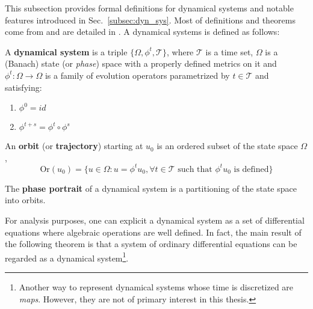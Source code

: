 This subsection provides formal definitions for dynamical systems and notable features introduced in Sec.~\ref{subsec:dyn_sys}. Most of definitions and theorems come from and are detailed in \cite{strogatz2018nonlinear, kuznetsov2013elements,Golubitsky2003a,Berglund2006,thompson2011predicting,dobrushkin2014applied}. A dynamical systems is defined as follows:
\begin{definition}
	A \textbf{dynamical system} is a triple $\{\Omega, \phi^t, \mathcal{T}\}$, where $\mathcal{T}$ is a time set, $\Omega$ is a (Banach) state (or \textit{phase}) space with a properly defined metrics on it and $\phi^t: \Omega \to \Omega$ is a family of evolution operators parametrized by $t \in \mathcal{T}$ and satisfying:
	\renewcommand{\theenumi}{\roman{enumi}}%
	\begin{enumerate}
		\item $\phi^0 = id$
		\item $\phi^{t+s} = \phi^t \circ \phi^s$ 
	\end{enumerate}
\end{definition}
\begin{definition}
	An \textbf{orbit} (or \textbf{trajectory}) starting at $u_0$ is an ordered subset of the state space $\Omega$,
	\begin{equation*}
		\text{Or}(u_0) = \{ u \in \Omega : u = \phi^t u_0, \forall t \in \mathcal{T} \text{ such that } \phi^t u_0 \text{ is defined} \}
	\end{equation*}
\end{definition}
\begin{definition}
	The \textbf{phase portrait} of a dynamical system is a partitioning of the state space into orbits.
\end{definition}
For analysis purposes, one can explicit a dynamical system as a set of differential equations where algebraic operations are well defined. In fact, the main result of the following theorem is that a system of ordinary differential equations can be regarded as a dynamical system\footnote{Another way to represent dynamical systems whose time is discretized are \textit{maps}. However, they are not of primary interest in this thesis.}.
